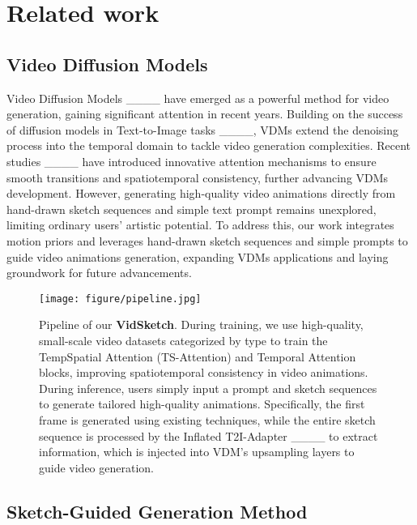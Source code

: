 \section{Related work}
\subsection{Video Diffusion Models}
Video Diffusion Models  ____ have emerged as a powerful method for video generation, gaining significant attention in recent years. Building on the success of diffusion models in Text-to-Image tasks ____, VDMs extend the denoising process into the temporal domain to tackle video generation complexities. Recent studies ____ have introduced innovative attention mechanisms to ensure smooth transitions and spatiotemporal consistency, further advancing VDMs development. However, generating high-quality video animations directly from hand-drawn sketch sequences and simple text prompt remains unexplored, limiting ordinary users' artistic potential. To address this, our work integrates motion priors and leverages hand-drawn sketch sequences and simple prompts to guide video animations generation, expanding VDMs applications and laying groundwork for future advancements.



\begin{figure*}[!t]
\vskip 0.05in
\begin{center}
\texttt{[image: figure/pipeline.jpg]}
\vskip -0.05in
\caption{Pipeline of our \textbf{VidSketch}. During training, we use high-quality, small-scale video datasets categorized by type to train the TempSpatial Attention (TS-Attention) and Temporal Attention blocks, improving spatiotemporal consistency in video animations. During inference, users simply input a prompt and sketch sequences to generate tailored high-quality animations. Specifically, the first frame is generated using existing techniques, while the entire sketch sequence is processed by the Inflated T2I-Adapter ____ to extract information, which is injected into VDM's upsampling layers to guide video generation.}
\label{fig:3}
\end{center}
\vskip -0.15in
\end{figure*}

\subsection{Sketch-Guided Generation Method}

